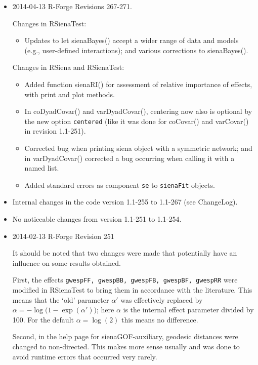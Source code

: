 \documentclass[a4paper,fleqn,11pt]{article}
\newcommand{\+}{\, + \,}
\newcommand{\sfn}[1]{\textsf{#1}}
\begin{document}
\begin{small}
\begin{itemize}
\item 2014-04-13 R-Forge Revisions 267-271.

Changes in RSienaTest:
\begin{itemize}
 \item Updates to let \sfn{sienaBayes()} accept
     a wider range of data and models (e.g., user-defined interactions);
     and various corrections to \sfn{sienaBayes()}.
\end{itemize}

Changes in RSiena and RSienaTest:
\begin{itemize}
\item Added function \sfn{sienaRI()} for assessment of relative importance of effects,
      with print and plot methods.
\item In \sfn{coDyadCovar()} and \sfn{varDyadCovar()}, centering now also is
      optional by the new option \texttt{centered} (like it was done for
      \sfn{coCovar()} and \sfn{varCovar()} in revision 1.1-251).
\item Corrected bug when printing siena object with a symmetric network;
     and in \sfn{varDyadCovar()} corrected a bug occurring when calling it
     with a named list.
\item Added standard errors as component \texttt{se} to \texttt{sienaFit}
     objects.
\end{itemize}


\item Internal changes in the code version 1.1-255 to 1.1-267 (see \sfn{ChangeLog}).

\item No noticeable changes from version 1.1-251 to 1.1-254.

\item 2014-02-13 R-Forge Revision 251

It should be noted that two changes were made that potentially
have an influence on some results obtained.

First, the effects \texttt{gwespFF, gwespBB, gwespFB, gwespBF, gwespRR}
were modified in RSienaTest to bring them in accordance with the literature.
This means that the `old' parameter $\alpha'$ was effectively replaced by
$\alpha = -\log\big(1-\exp(\alpha')\big)$; here $\alpha$ is the internal
effect parameter divided by 100. For the default $\alpha = \log(2)$
this means no difference.

Second, in the help page for \sfn{sienaGOF-auxiliary}, geodesic distances
were changed to non-directed. This makes more sense usually and was done to
avoid runtime errors that occurred very rarely.


\end{itemize}
\end{small}
\end{document}
